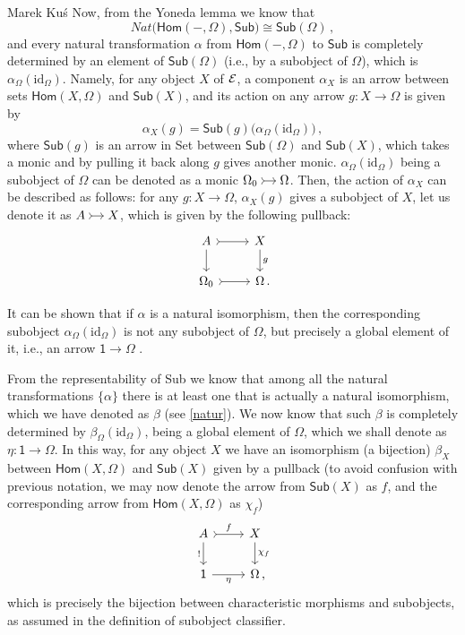 \begin{artengenv}{Marek Ku\'s}
Now, from the Yoneda lemma we know that
\[
Nat \big( \textsf{Hom}(-,\Omega), \textsf{Sub}  \big) \cong \textsf{Sub} (\Omega)\,,
\]
and every natural transformation $ \alpha $ from $ \textsf{Hom}(-,\Omega) $ to $ \textsf{Sub} $ is completely determined by an element of $ \textsf{Sub} (\Omega) $ (i.e., by a subobject of $ \Omega $), which is $ \alpha_\Omega(\text{id}_\Omega) $. Namely, for any object $ X $ of $ \mathcal{E} $, a component $ \alpha_X $ is an arrow between sets $ \textsf{Hom}(X,\Omega) $ and $\textsf{Sub} (X) $, and its action on any arrow $ g:X\to\Omega $ is given by
\[
\alpha_X (g)=\textsf{Sub}(g)\big(\alpha_\Omega (\text{id}_\Omega)\big)\,,
\]
where $ \textsf{Sub}(g) $ is an arrow in \textsf{Set} between $ \textsf{Sub}(\Omega) $ and $ \textsf{Sub}(X) $, which takes a monic and by pulling it back along $ g $ gives another monic. $ \alpha_\Omega (\text{id}_\Omega) $ being a subobject of $ \Omega $ can be denoted as a monic $\begin{tikzcd}[cramped, sep=small] \Omega_0 \ar[r, tail]  & \Omega \end{tikzcd}$. Then, the action of $ \alpha_X $ can be described as follows: for any $ g:X\to\Omega $, $ \alpha_X (g) $ gives a subobject of $ X $, let us denote it as $\begin{tikzcd}[cramped, sep=small] A \ar[r, tail]  & X \end{tikzcd}$, which is given by the following pullback:
\[\begin{tikzcd} 
A \arrow[r, tail] \arrow[d]    & X \arrow[d, "g"] \\
\Omega_0 \arrow[r, tail] & \Omega \nospacepunct{.}
\end{tikzcd}
\]

It can be shown that if $ \alpha $ is a natural isomorphism, then the corresponding subobject $ \alpha_\Omega (\text{id}_\Omega) $ is not any subobject of $ \Omega $, but precisely a global element of it, i.e., an arrow $ \textsf{1}\to\Omega $  \parencite[see e.g.][part of the proof on p.33f]{maclane-moerdijk-1994}. 

From the representability of \textsf{Sub} we know that among all the natural transformations $ \{\alpha\} $ there is at least one that is actually a natural isomorphism, which we have denoted as $ \beta $ (see \eqref{natur}). We now know that such $ \beta $ is completely determined by $ \beta_\Omega (\text{id}_\Omega) $, being a global element of $ \Omega $, which we shall denote as $ \eta:\textsf{1}\to\Omega $. In this way, for any object $ X $ we have an isomorphism (a bijection) $ \beta_X $ between $ \textsf{Hom}(X,\Omega) $ and $ \textsf{Sub}(X) $ given by a pullback (to avoid confusion with previous notation, we may now denote the arrow from $ \textsf{Sub}(X) $ as $ f $, and the corresponding arrow from $ \textsf{Hom}(X,\Omega) $ as $ \chi_f $)
\[\begin{tikzcd} 
A \arrow[r, tail, "f"] \arrow[d, "!"']    & X \arrow[d, "\chi_f"] \\
\textsf{1} \arrow[r, "\eta"'] & \Omega\nospacepunct{,}
\end{tikzcd}
\]
which is precisely the bijection between characteristic morphisms and subobjects, as assumed in the definition of subobject classifier.


\end{artengenv}
